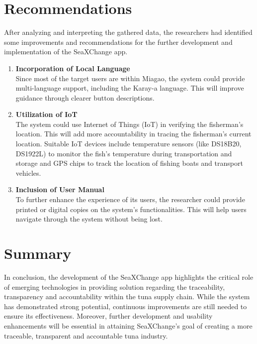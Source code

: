\section{Recommendations}
After analyzing and interpreting the gathered data, the researchers had identified some improvements and recommendations for the further development and implementation of the SeaXChange app.
\begin{enumerate}
	\item \textbf{Incorporation of Local Language}
	\\Since most of the target users are within Miagao, the system could provide multi-language support, including the Karay-a language. This will improve guidance through clearer button descriptions.
	
	\item \textbf{Utilization of IoT}
	\\The system could use Internet of Things (IoT) in verifying the fisherman's location. This will add more accountability in tracing the fisherman's current location. Suitable IoT devices include temperature sensors (like DS18B20, DS1922L) to monitor the fish's temperature during transportation and storage and GPS chips to track the location of fishing boats and transport vehicles.
	
	\item \textbf{Inclusion of User Manual }
	\\To further enhance the experience of its users, the researcher could provide printed or digital copies on the system's functionalities. This will help users navigate through the system without being lost.
\end{enumerate}

\section{Summary}
\noindent In conclusion, the development of the SeaXChange app highlights the critical role of emerging technologies in providing solution regarding the traceability, transparency and accountability within the tuna supply chain. While the system has demonstrated strong potential, continuous improvements are still needed to ensure its effectiveness. Moreover, further development and usability enhancements will be essential in attaining SeaXChange's goal of creating a more traceable, transparent and accountable tuna industry.
